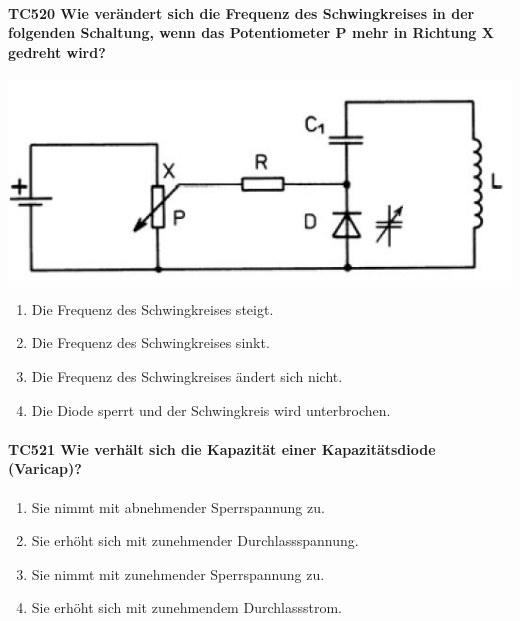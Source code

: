 \documentclass[8pt]{article}
\begin{document}
\begin{enumerate}
\begin{enumerate}[nolistsep,label=\Alph*]
{\begin{enumerate}[nolistsep,label=\Alph*]
\paragraph*{TC520 Wie verändert sich die Frequenz des Schwingkreises in der folgenden Schaltung, wenn das Potentiometer P mehr in Richtung X gedreht wird?}
\begin{center}
	\begin{minipage}{\linewidth}
		\centering
		\includegraphics[scale=1.0]{pics/tc520_a.jpg}
	\end{minipage}
\end{center}
\begin{enumerate}[nolistsep,label=\Alph*]
\item Die Frequenz des Schwingkreises steigt.
\item Die Frequenz des Schwingkreises sinkt.
\item Die Frequenz des Schwingkreises ändert sich nicht.
\item Die Diode sperrt und der Schwingkreis wird unterbrochen.
\end{enumerate}

\paragraph*{TC521 Wie verhält sich die Kapazität einer Kapazitätsdiode (Varicap)?}
\begin{enumerate}[nolistsep,label=\Alph*]
\item Sie nimmt mit abnehmender Sperrspannung zu. 
\item Sie erhöht sich mit zunehmender Durchlassspannung.
\item Sie nimmt mit zunehmender Sperrspannung zu.
\item Sie erhöht sich mit zunehmendem Durchlassstrom.
\end{enumerate}


\end{enumerate}}
\end{enumerate}
\end{enumerate}
\end{document}
